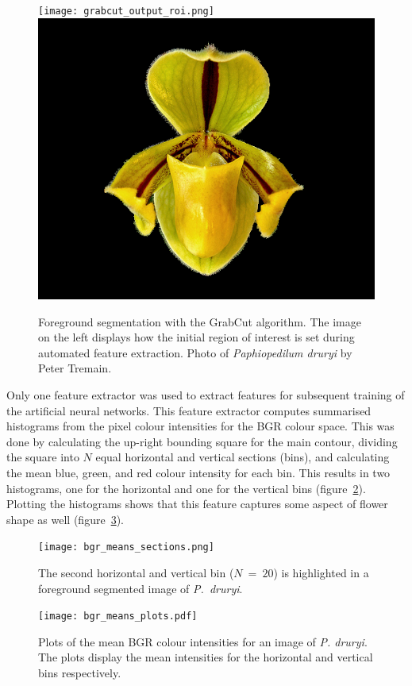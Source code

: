 \documentclass[3p,twocolumn,10pt]{elsarticle}
\begin{document}
\begin{figure}[t]
    \centering
    \minipage{\textwidth}
        \texttt{[image: grabcut\_output\_roi.png]}
        \includegraphics[width=0.495\linewidth]{grabcut_output.png}
    \endminipage
    \caption{Foreground segmentation with the GrabCut algorithm. The image on the left displays how the initial region of interest is set during automated feature extraction. Photo of \textit{Paphiopedilum druryi} by Peter Tremain.}
    \label{fig:grabcut-output}
\end{figure}

Only one feature extractor was used to extract features for subsequent training of the artificial neural networks. This feature extractor computes summarised histograms from the pixel colour intensities for the BGR colour space. This was done by calculating the up-right bounding square for the main contour, dividing the square into $N$ equal horizontal and vertical sections (bins), and calculating the mean blue, green, and red colour intensity for each bin. This results in two histograms, one for the horizontal and one for the vertical bins (figure~\ref{fig:bgr-means-sections}). Plotting the histograms shows that this feature captures some aspect of flower shape as well (figure~\ref{fig:bgr-means-plots}).

\begin{figure}[h]
    \centering
    \texttt{[image: bgr\_means\_sections.png]}
    \caption{The second horizontal and vertical bin ($N~=~20$) is highlighted in a foreground segmented image of \textit{P.~druryi}.}
    \label{fig:bgr-means-sections}
\end{figure}

\begin{figure}[t]
    \centering
    \texttt{[image: bgr\_means\_plots.pdf]}
    \caption{Plots of the mean BGR colour intensities for an image of \textit{P. druryi}. The plots display the mean intensities for the horizontal and vertical bins respectively.}
    \label{fig:bgr-means-plots}
\end{figure}
\end{document}
